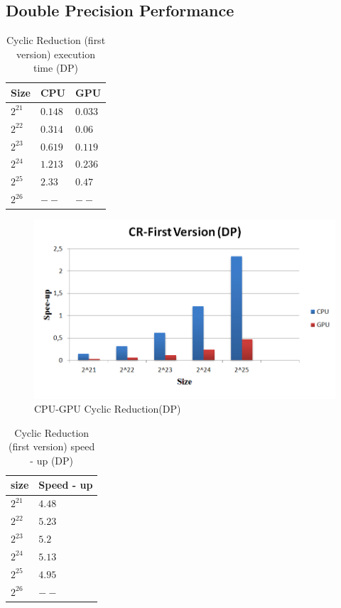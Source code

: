 \subsection{Double Precision Performance}


\begin{table}[H]
\caption{Cyclic Reduction (first version) execution time (DP)} 
\centering 
\begin{tabular}{| l | p{3cm} | p{3cm} |} 
\hline\hline 
Size & CPU & GPU  \\ [0.8ex] 
\hline 
        $2^{21}$ & $0.148$& $0.033$ \\ 	
        $2^{22}$ & $0.314$& $0.06$  \\ 	
        $2^{23}$ & $0.619$& $0.119$ \\ 
        $2^{24}$ & $1.213$& $0.236$ \\ 
        $2^{25}$ & $2.33$& $0.47$  \\ 
        $2^{26}$ & $--$& $--$      \\ [1ex]
\hline 
\end{tabular}
\label{table:cr_first_double} 
\end{table}

\begin{figure}[H]
   \centering
       \includegraphics[width=1\textwidth]{grafhmata/cr_first_dp.png}
   \caption{CPU-GPU Cyclic Reduction(DP)}
   \label{fig:CPU-GPU Cyclic Reduction(DP)}
\end{figure}

\begin{table}[H]
\caption{Cyclic Reduction (first version) speed - up (DP)} 
\centering 
\begin{tabular}{| l | p{3cm} |} 
\hline\hline 
size	 & Speed - up  \\  [0.8ex] 
\hline        
        $2^{21}$ & $4.48$      \\	
        $2^{22}$ & $5.23$     \\
        $2^{23}$ & $5.2$      \\ 
        $2^{24}$ & $5.13$    \\ 
        $2^{25}$ & $4.95$     \\ 
        $2^{26}$ & $--$       \\ [1ex]
        \hline
\end{tabular}
\label{table:cr_first_double_spup} 
\end{table}

